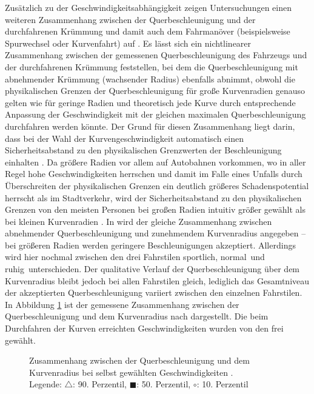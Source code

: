 Zusätzlich zu der Geschwindigkeitsabhängigkeit zeigen Untersuchungen einen weiteren Zusammenhang zwischen der Querbeschleunigung und der durchfahrenen Krümmung und damit auch dem Fahrmanöver (beispielsweise Spurwechsel oder Kurvenfahrt) auf \cite{Hugemann.2003,Xu.2015}. Es lässt sich ein nichtlinearer Zusammenhang zwischen der gemessenen Querbeschleunigung des Fahrzeugs und der durchfahrenen Krümmung feststellen, bei dem die Querbeschleunigung mit abnehmender Krümmung (wachsender Radius) ebenfalls abnimmt, obwohl die physikalischen Grenzen der Querbeschleunigung für große Kurvenradien genauso gelten wie für geringe Radien und theoretisch jede Kurve durch entsprechende Anpassung der Geschwindigkeit mit der gleichen maximalen Querbeschleunigung durchfahren werden könnte. Der Grund für diesen Zusammenhang liegt darin, dass  bei der Wahl der Kurvengeschwindigkeit automatisch einen Sicherheitsabstand zu den physikalischen Grenzwerten der Beschleunigung einhalten \cite{Hugemann.2003}. Da größere Radien vor allem auf Autobahnen vorkommen, wo in aller Regel hohe Geschwindigkeiten herrschen und damit im Falle eines Unfalls durch Überschreiten der physikalischen Grenzen ein deutlich größeres Schadenspotential herrscht als im Stadtverkehr, wird der Sicherheitsabstand zu den physikalischen Grenzen von den meisten Personen bei großen Radien intuitiv größer gewählt als bei kleinen Kurvenradien \cite{Xu.2015}. 
In \cite{Schulz.2008} wird der gleiche Zusammenhang zwischen abnehmender Querbeschleunigung und zunehmendem Kurvenradius angegeben -- bei größeren Radien werden geringere Beschleunigungen akzeptiert. Allerdings wird hier nochmal zwischen den drei Fahrstilen \glqq sportlich\grqq, \glqq normal\grqq~und \glqq ruhig\grqq~unterschieden. Der qualitative Verlauf der Querbeschleunigung über dem Kurvenradius bleibt jedoch bei allen Fahrstilen gleich, lediglich das Gesamtniveau der akzeptierten Querbeschleunigung variiert zwischen den einzelnen Fahrstilen. In Abbildung \ref{fig:ay_R_hugemann} ist der gemessene Zusammenhang zwischen der Querbeschleunigung und dem Kurvenradius nach \cite{Hugemann.2003} dargestellt. Die beim Durchfahren der Kurven erreichten Geschwindigkeiten wurden von den  frei gewählt. 
\begin{figure}[h]
	\centering
	\fontsize{28pt}{16pt}\selectfont
	\caption{Zusammenhang zwischen der Querbeschleunigung und dem Kurvenradius bei selbst gewählten Geschwindigkeiten \cite{Hugemann.2003}. \\
		Legende: $\triangle$: 90. Perzentil, $\blacksquare$: 50. Perzentil, $\circ$: 10. Perzentil}
	\label{fig:ay_R_hugemann}
\end{figure}

